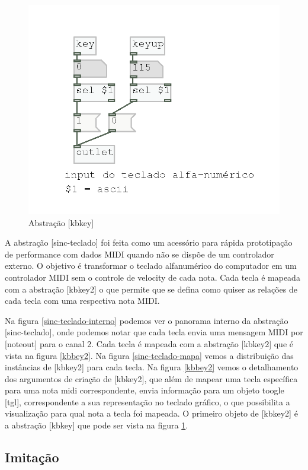 \documentclass[draft]{ppgmus}
\begin{document}
\begin{figure}
\includegraphics[scale=.5]{kbkey}
\caption{Abstração [kbkey]}
\label{kbkey}
\end{figure}


A abstração [sinc-teclado] foi feita como um acessório para rápida prototipação de 
performance com dados MIDI quando não se dispõe de um controlador externo. O objetivo
é transformar o teclado alfanumérico do computador em um controlador MIDI sem o controle de velocity
de cada nota. Cada tecla é mapeada com a abstração [kbkey2] o que permite que se defina como quiser
as relações de cada tecla com uma respectiva nota MIDI.

Na figura \ref{sinc-teclado-interno} podemos ver o panorama interno da abstração [sinc-teclado], onde podemos notar
que cada tecla envia uma mensagem MIDI por [noteout] para o canal 2.
Cada tecla é mapeada com a abstração [kbkey2] que é vista na figura \ref{kbbey2}. 
Na figura \ref{sinc-teclado-mapa} vemos a distribuição das instâncias de [kbkey2] para
cada tecla. Na figura \ref{kbbey2} vemos o detalhamento dos argumentos de criação de [kbkey2], que além de mapear
uma tecla específica para uma nota midi correspondente, envia informação para um objeto toogle [tgl],
correspondente a sua representação no teclado gráfico, o que possibilita a visualização para qual nota
a tecla foi mapeada. O primeiro objeto de [kbkey2] é a abstração [kbkey] que pode ser vista na figura \ref{kbkey}.




\subsection{Imitação}
\end{document}
